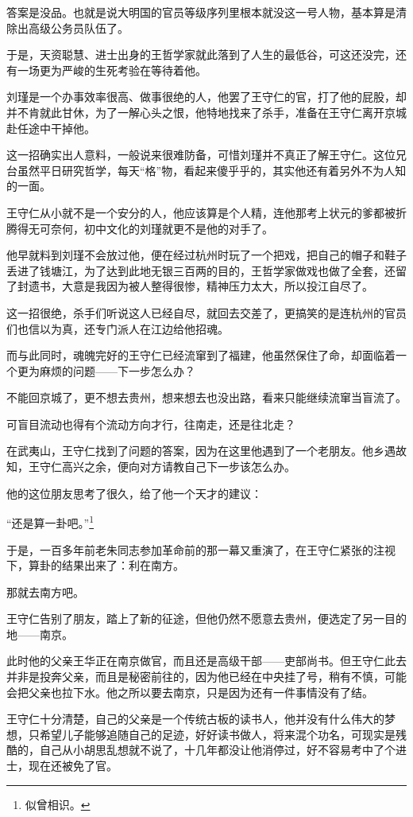 \begin{multicols}{\theparacolNo}
答案是没品。也就是说大明国的官员等级序列里根本就没这一号人物，基本算是清除出高级公务员队伍了。

于是，天资聪慧、进士出身的王哲学家就此落到了人生的最低谷，可这还没完，还有一场更为严峻的生死考验在等待着他。

刘瑾是一个办事效率很高、做事很绝的人，他罢了王守仁的官，打了他的屁股，却并不肯就此甘休，为了一解心头之恨，他特地找来了杀手，准备在王守仁离开京城赴任途中干掉他。

这一招确实出人意料，一般说来很难防备，可惜刘瑾并不真正了解王守仁。这位兄台虽然平日研究哲学，每天“格”物，看起来傻乎乎的，其实他还有着另外不为人知的一面。

王守仁从小就不是一个安分的人，他应该算是个人精，连他那考上状元的爹都被折腾得无可奈何，初中文化的刘瑾就更不是他的对手了。

他早就料到刘瑾不会放过他，便在经过杭州时玩了一个把戏，把自己的帽子和鞋子丢进了钱塘江，为了达到此地无银三百两的目的，王哲学家做戏也做了全套，还留了封遗书，大意是我因为被人整得很惨，精神压力太大，所以投江自尽了。

这一招很绝，杀手们听说这人已经自尽，就回去交差了，更搞笑的是连杭州的官员们也信以为真，还专门派人在江边给他招魂。

而与此同时，魂魄完好的王守仁已经流窜到了福建，他虽然保住了命，却面临着一个更为麻烦的问题——下一步怎么办？

不能回京城了，更不想去贵州，想来想去也没出路，看来只能继续流窜当盲流了。

可盲目流动也得有个流动方向才行，往南走，还是往北走？

在武夷山，王守仁找到了问题的答案，因为在这里他遇到了一个老朋友。他乡遇故知，王守仁高兴之余，便向对方请教自己下一步该怎么办。

他的这位朋友思考了很久，给了他一个天才的建议：

“还是算一卦吧。”\footnote{似曾相识。}

于是，一百多年前老朱同志参加革命前的那一幕又重演了，在王守仁紧张的注视下，算卦的结果出来了：利在南方。

那就去南方吧。

王守仁告别了朋友，踏上了新的征途，但他仍然不愿意去贵州，便选定了另一目的地——南京。

此时他的父亲王华正在南京做官，而且还是高级干部——吏部尚书。但王守仁此去并非是投奔父亲，而且是秘密前往的，因为他已经在中央挂了号，稍有不慎，可能会把父亲也拉下水。他之所以要去南京，只是因为还有一件事情没有了结。

王守仁十分清楚，自己的父亲是一个传统古板的读书人，他并没有什么伟大的梦想，只希望儿子能够追随自己的足迹，好好读书做人，将来混个功名，可现实是残酷的，自己从小胡思乱想就不说了，十几年都没让他消停过，好不容易考中了个进士，现在还被免了官。


\end{multicols}
